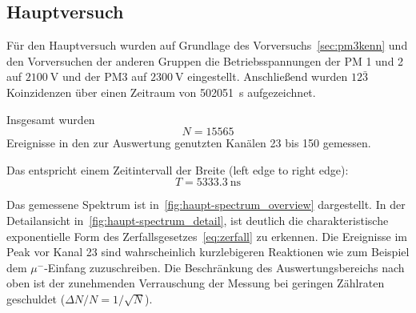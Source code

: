\documentclass[slug=LM, room=Andreas-Schubert-Bau\,\ K\ 1A, supervisor=Anne-Sophie\ Berthold, coursedate=13.\ 12.\ 2019]{../../Lab_Report_LaTeX/lab_report}
\begin{document}
%
%

\subsection{Hauptversuch}
\label{sec:hauptversuch}

F\"ur den Hauptversuch wurden auf Grundlage des
Vorversuchs~\ref{sec:pm3kenn} und den Vorversuchen der anderen Gruppen
die Betriebsspannungen der PM 1 und 2 auf \(\SI{2100}{\volt}\) und der
PM3 auf \(\SI{2300}{\volt}\) eingestellt. Anschließend wurden
\(\textit{12}\bar{\textit{3}}\) Koinzidenzen \"uber einen Zeitraum von
\SI{502051}{\second} aufgezeichnet.

Insgesamt wurden
\begin{equation}
  \label{eq:totalcount}
  N=15565
\end{equation}
Ereignisse in den zur Auswertung genutzten Kan\"alen 23 bis 150
gemessen.

Das entspricht einem Zeitintervall der Breite (left edge to right
edge):
\begin{equation}
  \label{eq:totalwidth}
  T = \SI{5333.3}{\nano\second}
\end{equation}

Das gemessene Spektrum ist
in~\ref{fig:haupt-spectrum_overview} dargestellt. In der
Detailansicht in~\ref{fig:haupt-spectrum_detail}, ist deutlich die
charakteristische exponentielle Form des
Zerfallsgesetzes~\ref{eq:zerfall} zu erkennen.
Die Ereignisse im Peak vor Kanal 23 sind wahrscheinlich kurzlebigeren
Reaktionen wie zum Beispiel dem \(\mu^{-}\)-Einfang zuzuschreiben. Die
Beschr\"ankung des Auswertungsbereichs nach oben ist der zunehmenden
Verrauschung der Messung bei geringen Z\"ahlraten geschuldet (\(\Delta
N/N=1/\sqrt{N}\)).
\end{document}
